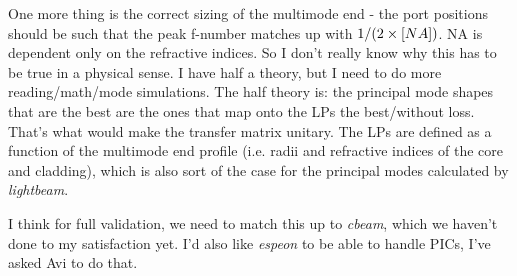 \documentclass{article}
\begin{document}
    One more thing is the correct sizing of the multimode end - the port positions should be such that the peak f-number matches up with $1/(2 \times \text[NA])$. NA is dependent only on the refractive indices. So I don't really know why this has to be true in a physical sense. I have half a theory, but I need to do more reading/math/mode simulations. The half theory is: the principal mode shapes that are the best are the ones that map onto the LPs the best/without loss. That's what would make the transfer matrix unitary. The LPs are defined as a function of the multimode end profile (i.e. radii and refractive indices of the core and cladding), which is also sort of the case for the principal modes calculated by \textit{lightbeam}.

    I think for full validation, we need to match this up to \textit{cbeam}, which we haven't done to my satisfaction yet. I'd also like \textit{espeon} to be able to handle PICs, I've asked Avi to do that.
\end{document}
